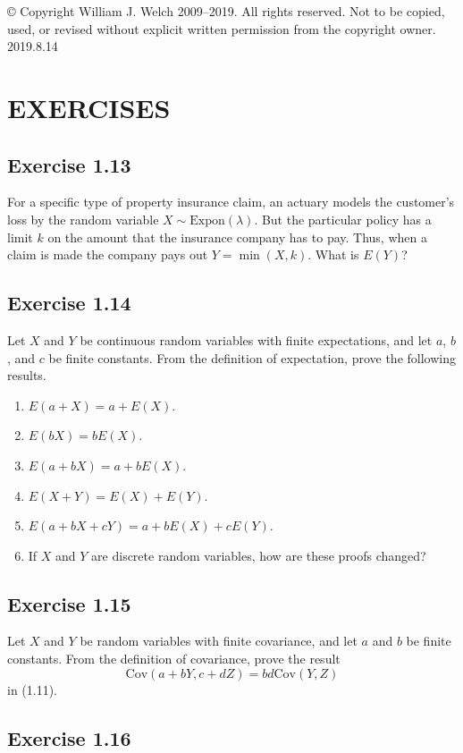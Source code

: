 \documentclass{book}
\begin{document}
© Copyright William J. Welch 2009--2019. All rights reserved. Not to be copied, used, or revised without explicit written permission from the copyright owner. 2019.8.14

\section{EXERCISES} 

\subsection{Exercise 1.13}

For a specific type of property insurance claim, an actuary models the customer’s loss by the random variable $X \sim \text{Expon}(\lambda)$. But the particular policy has a limit $k$ on the amount that the insurance company has to pay. Thus, when a claim is made the company pays out $Y = \min(X, k)$. What is $E(Y)$?

\subsection{Exercise 1.14}

Let $X$ and $Y$ be continuous random variables with finite expectations, and let $a$, $b$, and $c$ be finite constants. From the definition of expectation, prove the following results.
\begin{enumerate}
    \item $E(a + X) = a + E(X)$.
    \item $E(bX) = bE(X)$.
    \item $E(a + bX) = a + bE(X)$.
    \item $E(X + Y) = E(X) + E(Y)$.
    \item $E(a + bX + cY) = a + bE(X) + cE(Y)$.
    \item If $X$ and $Y$ are discrete random variables, how are these proofs changed?
\end{enumerate}

\subsection{Exercise 1.15}

Let $X$ and $Y$ be random variables with finite covariance, and let $a$ and $b$ be finite constants. From the definition of covariance, prove the result
\[
\text{Cov}(a + bY, c + dZ) = bd \text{Cov}(Y, Z)
\]
in (1.11).

\subsection{Exercise 1.16}
\end{document}
